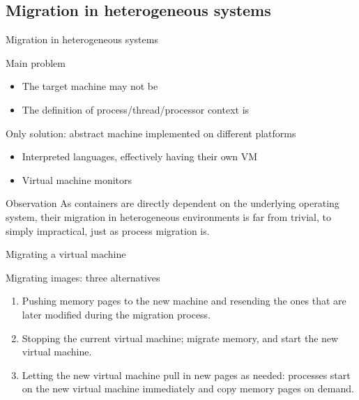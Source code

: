 \subsection{Migration in heterogeneous systems}
\begin{slide}{Migration in heterogeneous systems}
  \begin{block}{Main problem}
    \begin{itemize}
    \item The target machine may not be 
    \item The definition of process/thread/processor context is 
    \end{itemize}
  \end{block}
  \begin{alertblock}{Only solution: abstract machine implemented on different platforms}
    \begin{itemize}
    \item Interpreted languages, effectively having their own VM
    \item Virtual machine monitors
    \end{itemize}
  \end{alertblock}
  \begin{alertblock}{Observation}
    As containers are directly dependent on the underlying operating system, their migration in heterogeneous
    environments is far from trivial, to simply impractical, just as process migration is.
  \end{alertblock}

\end{slide}
\begin{slide}{Migrating a virtual machine}
  \begin{block}{Migrating images: three alternatives}
    \begin{enumerate}
    \item Pushing memory pages to the new machine and resending the ones that are later modified during the
      migration process.
    \item Stopping the current virtual machine; migrate memory, and start the new virtual machine.
    \item Letting the new virtual machine pull in new pages as needed: processes start on the new
      virtual machine immediately and copy memory pages on demand.
    \end{enumerate}
  \end{block}
\end{slide}
